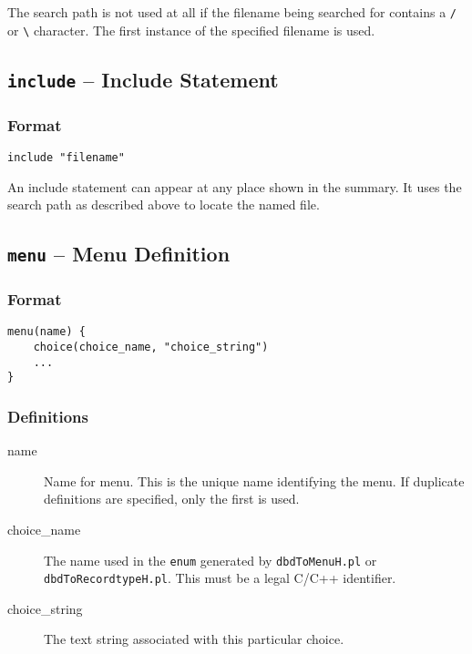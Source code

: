 The search path is not used at all if the filename being searched for contains a \verb|/| or \verb|\| character.
The first instance of the specified filename is used.

\subsection{\texttt{include} -- Include Statement}

\subsubsection{Format}

\begin{lstlisting}[language=dbd]
include "filename"
\end{lstlisting}

An include statement can appear at any place shown in the summary.
It uses the search path as described above to locate the named file.

\subsection{\texttt{menu} -- Menu Definition}

\subsubsection{Format}

\begin{lstlisting}[language=dbd]
menu(name) {
    choice(choice_name, "choice_string")
    ...
}
\end{lstlisting}

\subsubsection{Definitions}

\begin{description}
\item [name] Name for menu. This is the unique name identifying the menu.
If duplicate definitions are specified, only the first is used.

\item [choice\_name] The name used in the \verb|enum| generated by \verb|dbdToMenuH.pl| or \verb|dbdToRecordtypeH.pl|.
This must be a legal C/C++ identifier.

\item [choice\_string] The text string associated with this particular choice.
\end{description}

